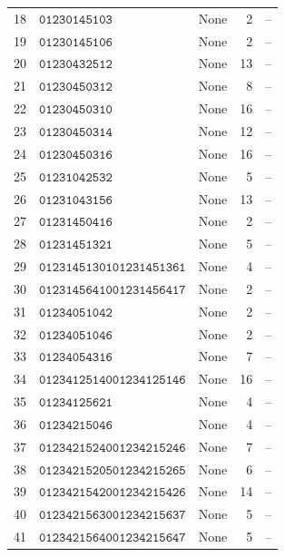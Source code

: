 \documentclass[11pt,a4paper]{article}
\theoremstyle{definition}
\theoremstyle{remark}
\begin{document}
\begin{longtable}{r p{} p{} r r}
18 & \(\mathtt{01230145103}\) & None & 2 & --\\
19 & \(\mathtt{01230145106}\) & None & 2 & --\\
20 & \(\mathtt{01230432512}\) & None & 13 & --\\
21 & \(\mathtt{01230450312}\) & None & 8 & --\\
22 & \(\mathtt{01230450310}\) & None & 16 & --\\
23 & \(\mathtt{01230450314}\) & None & 12 & --\\
24 & \(\mathtt{01230450316}\) & None & 16 & --\\
25 & \(\mathtt{01231042532}\) & None & 5 & --\\
26 & \(\mathtt{01231043156}\) & None & 13 & --\\
27 & \(\mathtt{01231450416}\) & None & 2 & --\\
28 & \(\mathtt{01231451321}\) & None & 5 & --\\
29 & \(\mathtt{01231451301}\)\newline \(\mathtt{01231451361}\) & None & 4 & --\\
30 & \(\mathtt{01231456410}\)\newline \(\mathtt{01231456417}\) & None & 2 & --\\
31 & \(\mathtt{01234051042}\) & None & 2 & --\\
32 & \(\mathtt{01234051046}\) & None & 2 & --\\
33 & \(\mathtt{01234054316}\) & None & 7 & --\\
34 & \(\mathtt{01234125140}\)\newline \(\mathtt{01234125146}\) & None & 16 & --\\
35 & \(\mathtt{01234125621}\) & None & 4 & --\\
36 & \(\mathtt{01234215046}\) & None & 4 & --\\
37 & \(\mathtt{01234215240}\)\newline \(\mathtt{01234215246}\) & None & 7 & --\\
38 & \(\mathtt{01234215205}\)\newline \(\mathtt{01234215265}\) & None & 6 & --\\
39 & \(\mathtt{01234215420}\)\newline \(\mathtt{01234215426}\) & None & 14 & --\\
40 & \(\mathtt{01234215630}\)\newline \(\mathtt{01234215637}\) & None & 5 & --\\
41 & \(\mathtt{01234215640}\)\newline \(\mathtt{01234215647}\) & None & 5 & --\\

\end{longtable}
\end{document}
